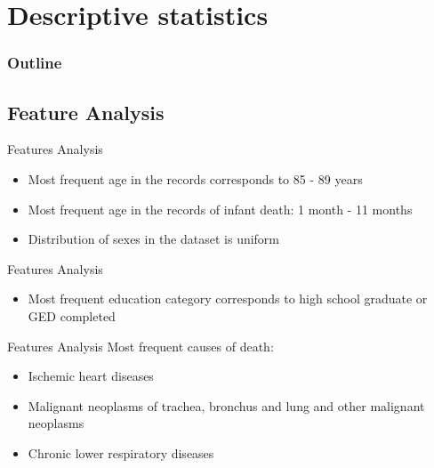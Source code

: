 \documentclass[xcolor=table]{beamer}
\begin{document}
\section{Descriptive statistics}
     \begin{frame}{}
     \frametitle{Outline}
     \tableofcontents[currentsection]
     \end{frame}
	
\subsection{Feature Analysis}
	\begin{frame}{Features Analysis}
		\begin{itemize}
			\item Most frequent age in the records corresponds to 85 - 89 years
			\item Most frequent age in the records of infant death: 1 month - 11 months
			\item Distribution of sexes in the dataset is uniform
		\end{itemize}
     \end{frame}
     
     \begin{frame}{Features Analysis}
     	\begin{itemize}
			\item Most frequent education category corresponds to high school graduate or GED completed
		\end{itemize}
     	\begin{center}
		 \end{center}
     \end{frame}
     
      \begin{frame}{Features Analysis}
      	Most frequent causes of death:
     	\begin{itemize}
			\item Ischemic heart diseases
			\item Malignant neoplasms of trachea, bronchus and lung and other malignant neoplasms
			\item Chronic lower respiratory diseases
		\end{itemize}
     	\begin{center}
		 \end{center}
     \end{frame}
     
\end{document}

